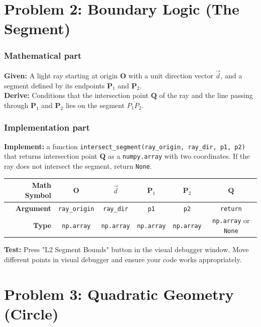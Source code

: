 \documentclass[11pt]{article}
\begin{document}
\section*{Problem 2: Boundary Logic (The Segment)}

\subsubsection*{Mathematical part}
\textbf{Given:} A light ray starting at origin $\mathbf{O}$ with a unit direction vector $\vec{d}$, and a segment defined by its endpoints $\mathbf{P}_1$ and $\mathbf{P}_2$. \\
\textbf{Derive:} Conditions that the intersection point $\mathbf{Q}$ of the ray and the line passing through $\mathbf{P}_1$ and $\mathbf{P}_2$ lies on the segment $\overline{P_1P_2}$. \\

\subsubsection*{Implementation part}
\textbf{Implement:} a function \lstinline|intersect_segment(ray_origin, ray_dir, p1, p2)| that returns intersection point $\mathbf{Q}$ as a \lstinline|numpy.array| with two coordinates. If the ray does not intersect the segment, return \lstinline|None|.

\begin{center}
\renewcommand{\arraystretch}{2.0}
\begin{tabular}{r | c | c | c | c | c}
\toprule
\textbf{Math Symbol} & $\mathbf{O}$ & $\vec{d}$ & $\mathbf{P}_1$ & $\mathbf{P}_2$ & $\mathbf{Q}$ \\ \midrule
\textbf{Argument} & \lstinline|ray_origin| & \lstinline|ray_dir| & \lstinline|p1| & \lstinline|p2| & \lstinline|return| \\ \midrule
\textbf{Type} & \lstinline|np.array| & \lstinline|np.array| & \lstinline|np.array| & \lstinline|np.array| & \lstinline|np.array| or \lstinline|None| \\
\bottomrule
\end{tabular}
\end{center}
\textbf{Test:} Press "L2 Segment Bounds" button in the visual debugger window. Move different points in visual debugger and ensure your code works appropriately.


\section*{Problem 3: Quadratic Geometry (Circle)}
\end{document}
